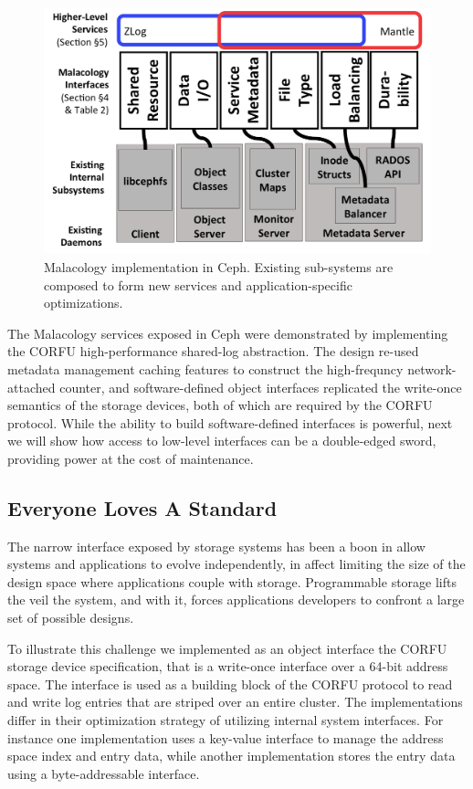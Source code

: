 \begin{figure}[th]
\centering
\includegraphics[width=1.0\linewidth]{implementation-overview.png}
\caption{Malacology implementation in Ceph. Existing sub-systems are composed
    to form new services and application-specific optimizations.}
\label{fig:malacology}
\end{figure}

The Malacology services exposed in Ceph were demonstrated by implementing the
CORFU high-performance shared-log abstraction. The design re-used metadata
management caching features to construct the high-frequncy network-attached
counter, and software-defined object interfaces replicated the write-once
semantics of the storage devices, both of which are required by the CORFU
protocol. While the ability to build software-defined interfaces is powerful,
next we will show how access to low-level interfaces can be a double-edged
sword, providing power at the cost of maintenance.

\subsection{Everyone Loves A Standard}

The narrow interface exposed by storage systems has been a boon in allow
systems and applications to evolve independently, in affect limiting the size
of the design space where applications couple with storage. Programmable
storage lifts the veil the system, and with it, forces applications developers
to confront a large set of possible designs.

To illustrate this challenge we implemented as an object interface the CORFU
storage device specification, that is a write-once interface over a 64-bit
address space. The interface is used as a building block of the CORFU protocol
to read and write log entries that are striped over an entire cluster. 
The implementations differ in their optimization strategy of utilizing
internal system interfaces. For instance one implementation uses a key-value
interface to manage the address space index and entry data, while another
implementation stores the entry data using a byte-addressable interface.

